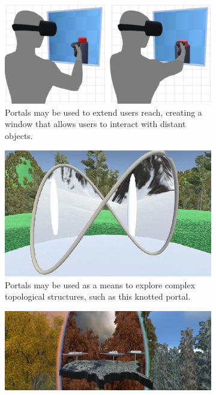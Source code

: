 \begin{itemize}
    
     \begin{figure}[b]
        \centering
        \begin{subfigure}{0.4\textwidth} %
            \includegraphics[width=\linewidth]{NOVAthesisFiles/Images/papers/reach.png}
            \caption{Portals may be used to extend users reach, creating a window that allows users to interact with distant objects.~\cite{Ablett2024}}
            \label{fig:avatars-torso}
        \end{subfigure}
        \begin{subfigure}{0.4\textwidth} %
            \includegraphics[width=\linewidth]{NOVAthesisFiles/Images/papers/knotted-portal.png}
            \caption{Portals may be used as a means to explore complex topological structures, such as this knotted portal.~\cite{Summermann2021}}
            \label{fig:avatars-vive-trackers}
        \end{subfigure}
        \begin{subfigure}{.8\textwidth} %
            \includegraphics[width=\linewidth]{NOVAthesisFiles/Images/papers/wedge.png}

\end{subfigure}
\end{figure}
\end{itemize}
